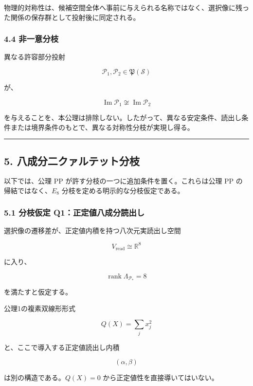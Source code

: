 \documentclass[
  a4paper,
  ja=minimal,
  xelatex,
  paragraph-mark={},
]{bxjsarticle}
\begin{document}
物理的対称性は、候補空間全体へ事前に与えられる名称ではなく、選択像に残った関係の保存群として投射後に同定される。

\subsubsection{4.4 非一意分枝}\label{ux975eux4e00ux610fux5206ux679d}

異なる許容部分投射

\[
\mathcal P_1,\mathcal P_2
\in
\mathfrak P(\mathscr S)
\]

が、

\[
\operatorname{Im}\mathcal P_1
\not\cong
\operatorname{Im}\mathcal P_2
\]

を与えることを、本公理は排除しない。したがって、異なる安定条件、読出し条件または境界条件のもとで、異なる対称性分枝が実現し得る。

\begin{center}\rule{0.5\linewidth}{0.5pt}\end{center}

\subsection{5.
八成分二クァルテット分枝}\label{ux516bux6210ux5206ux4e8cux30afux30a1ux30ebux30c6ux30c3ux30c8ux5206ux679d}

以下では、公理 PP が許す分枝の一つに追加条件を置く。これらは公理 PP
の帰結ではなく、\(E_8\) 分枝を定める明示的な分枝仮定である。

\subsubsection{5.1 分枝仮定
Q1：正定値八成分読出し}\label{ux5206ux679dux4eeeux5b9a-q1ux6b63ux5b9aux5024ux516bux6210ux5206ux8aadux51faux3057}

選択像の遷移差が、正定値内積を持つ八次元実読出し空間

\[
V_{\mathrm{read}}
\cong
\mathbb R^8
\]

に入り、

\[
\operatorname{rank}
\Lambda_{\mathcal P_*}
{}=8
\]

を満たすと仮定する。

公理1の複素双線形形式

\[
Q(X)=\sum_jx_j^2
\]

と、ここで導入する正定値読出し内積

\[
(\alpha,\beta)
\]

は別の構造である。\(Q(X)=0\) から正定値性を直接導いてはいない。
\end{document}
